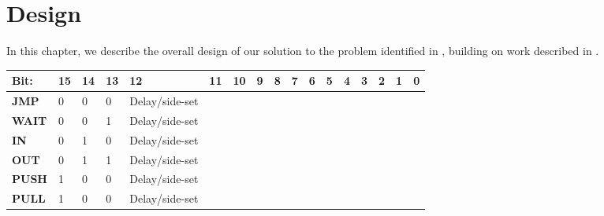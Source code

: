 \chapter{Design}
\label{ch:design}

In this chapter, we describe the overall design of our solution to the problem identified in , building on work described in .
\begin{table}[]
    \begin{tabular}{|l|l|l|l|lllll|l|l|l|l|l|l|l|l|}
        \hline
        \textbf{Bit:} & 15 & 14 & 13 & \multicolumn{1}{l|}{12} & \multicolumn{1}{l|}{11} & \multicolumn{1}{l|}{10} & \multicolumn{1}{l|}{9} & 8         & 7         & 6         & 5         & 4         & 3         & 2         & 1         & 0         \\ \hline
        \textbf{JMP}  & 0  & 0  & 0  & Delay/side-set          &                         &                         &                        &           &           &           &           &           &           &           &           &           \\ \hline
        \textbf{WAIT} & 0  & 0  & 1  & Delay/side-set          &                         & \textbf{}               & \textbf{}              & \textbf{} & \textbf{} & \textbf{} & \textbf{} & \textbf{} & \textbf{} & \textbf{} & \textbf{} & \textbf{} \\ \hline
        \textbf{IN}   & 0  & 1  & 0  & Delay/side-set          &                         &                         &                        &           &           &           &           &           &           &           &           &           \\ \hline
        \textbf{OUT}  & 0  & 1  & 1  & Delay/side-set          &                         &                         &                        &           &           &           &           &           &           &           &           &           \\ \hline
        \textbf{PUSH} & 1  & 0  & 0  & Delay/side-set          &                         &                         &                        &           &           &           &           &           &           &           &           &           \\ \hline
        \textbf{PULL} & 1  & 0  & 0  & Delay/side-set          &                         &                         &                        &           &           &           &           &           &           &           &           &           \\ \hline

\end{tabular}
\end{table}
